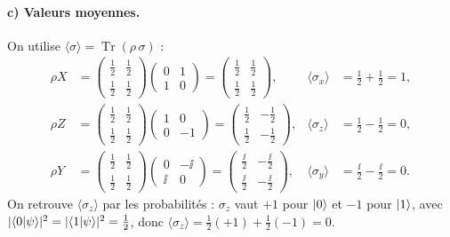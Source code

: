 \begin{correction}
\paragraph{c) Valeurs moyennes.} On utilise $\langle\sigma\rangle=\operatorname{Tr}(\rho\,\sigma)$ :
\begin{align*}
  \rho X&=\begin{pmatrix}\frac12&\frac12\\[0.4ex]\frac12&\frac12\end{pmatrix}
     \begin{pmatrix}0&1\\1&0\end{pmatrix}
     =\begin{pmatrix}\frac12&\frac12\\[0.4ex]\frac12&\frac12\end{pmatrix},
     &\langle\sigma_x\rangle&=\tfrac12+\tfrac12=1,\\[1.5ex]
  \rho Z&=\begin{pmatrix}\frac12&\frac12\\[0.4ex]\frac12&\frac12\end{pmatrix}
     \begin{pmatrix}1&0\\0&-1\end{pmatrix}
     =\begin{pmatrix}\frac12&-\frac12\\[0.4ex]\frac12&-\frac12\end{pmatrix},
     &\langle\sigma_z\rangle&=\tfrac12-\tfrac12=0,\\[1.5ex]
  \rho Y&=\begin{pmatrix}\frac12&\frac12\\[0.4ex]\frac12&\frac12\end{pmatrix}
     \begin{pmatrix}0&-\ii\\\ii&0\end{pmatrix}
     =\begin{pmatrix}\frac{\ii}2&-\frac{\ii}2\\[0.4ex]\frac{\ii}2&-\frac{\ii}2\end{pmatrix},
     &\langle\sigma_y\rangle&=\tfrac{\ii}2-\tfrac{\ii}2=0 .
\end{align*}
On retrouve $\langle\sigma_z\rangle$ par les probabilités : $\sigma_z$ vaut $+1$ pour $|0\rangle$ et
$-1$ pour $|1\rangle$, avec $|\langle 0|\psi\rangle|^2=|\langle 1|\psi\rangle|^2=\frac12$, donc
$\langle\sigma_z\rangle=\frac12(+1)+\frac12(-1)=0$.


\end{correction}
